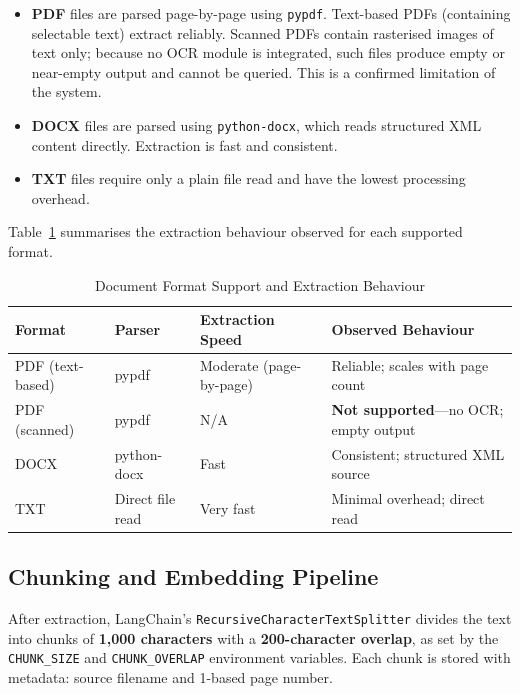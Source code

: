 \begin{itemize}[leftmargin=1.5em, itemsep=3pt]
    \item \textbf{PDF} files are parsed page-by-page using \texttt{pypdf}.
    Text-based PDFs (containing selectable text) extract reliably.
    Scanned PDFs contain rasterised images of text only; because no OCR
    module is integrated, such files produce empty or near-empty output
    and cannot be queried. This is a confirmed limitation of the system.

    \item \textbf{DOCX} files are parsed using \texttt{python-docx}, which
    reads structured XML content directly. Extraction is fast and consistent.

    \item \textbf{TXT} files require only a plain file read and have the
    lowest processing overhead.
\end{itemize}

Table~\ref{tab:format_support} summarises the extraction behaviour observed
for each supported format.

\begin{table}[H]
\centering
\caption{Document Format Support and Extraction Behaviour}
\label{tab:format_support}
\renewcommand{\arraystretch}{1.35}
\begin{tabular}{p{2.8cm} p{2.2cm} p{3.0cm} p{4.5cm}}
\toprule
\textbf{Format} & \textbf{Parser} & \textbf{Extraction Speed} & \textbf{Observed Behaviour} \\
\midrule
PDF (text-based) & pypdf           & Moderate (page-by-page) & Reliable; scales with page count \\
PDF (scanned)    & pypdf           & N/A                     & \textbf{Not supported}---no OCR; empty output \\
DOCX             & python-docx     & Fast                    & Consistent; structured XML source \\
TXT              & Direct file read & Very fast              & Minimal overhead; direct read \\
\bottomrule
\end{tabular}
\end{table}

\subsection{Chunking and Embedding Pipeline}

After extraction, LangChain's \texttt{RecursiveCharacterTextSplitter} divides
the text into chunks of \textbf{1{,}000 characters} with a \textbf{200-character
overlap}, as set by the \texttt{CHUNK\_SIZE} and \texttt{CHUNK\_OVERLAP}
environment variables. Each chunk is stored with metadata: source filename
and 1-based page number.

